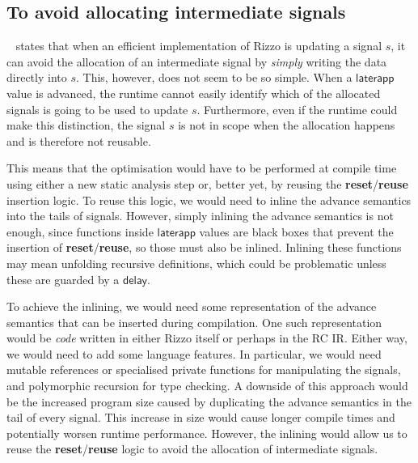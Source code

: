 \subsection{To avoid allocating intermediate signals}
\label{section:future_work:reuse}

\citeauthor*{rizzo_modal_2025}~\cite{rizzo_modal_2025} states that when an efficient implementation of Rizzo is updating a signal $s$, it can avoid the allocation of an intermediate signal by \emph{simply} writing the data directly into $s$. This, however, does not seem to be so simple.
When a $\mathsf{laterapp}$ value is advanced, the runtime cannot easily identify which of the allocated signals is going to be used to update $s$.
Furthermore, even if the runtime could make this distinction, the signal $s$ is not in scope when the allocation happens and is therefore not reusable.


This means that the optimisation would have to be performed at compile time using either a new static analysis step or, better yet, by reusing the \textbf{reset}/\textbf{reuse} insertion logic. To reuse this logic, we would need to inline the advance semantics into the tails of signals. However, simply inlining the advance semantics is not enough, since functions inside $\mathsf{laterapp}$ values are black boxes that prevent the insertion of \textbf{reset}/\textbf{reuse}, so those must also be inlined. Inlining these functions may mean unfolding recursive definitions, which could be problematic unless these are guarded by a $\mathsf{delay}$. 

To achieve the inlining, we would need some representation of the advance semantics that can be inserted during compilation. One such representation would be \emph{code} written in either Rizzo itself or perhaps in the RC IR.\@
Either way, we would need to add some language features. In particular, we would need mutable references or specialised private functions for manipulating the signals, and polymorphic recursion for type checking.
A downside of this approach would be the increased program size caused by duplicating the advance semantics in the tail of every signal. This increase in size would cause longer compile times and potentially worsen runtime performance.
However, the inlining would allow us to reuse the \textbf{reset}/\textbf{reuse} logic to avoid the allocation of intermediate signals.

